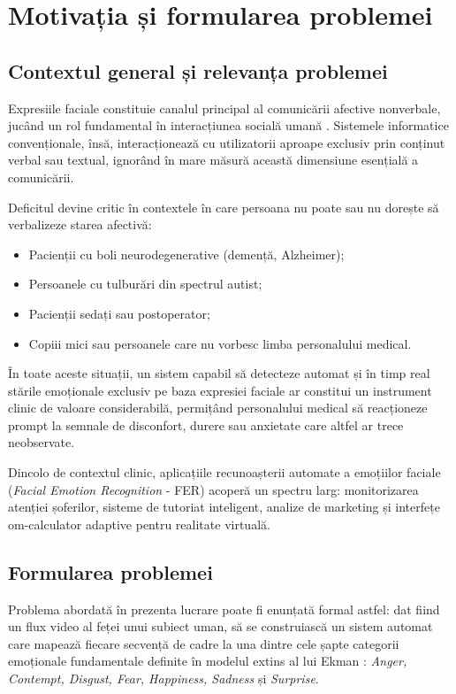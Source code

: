 \chapter{Motivația și formularea problemei}

\section*{Contextul general și relevanța problemei}

Expresiile faciale constituie canalul principal al comunicării afective nonverbale, jucând un rol fundamental în interacțiunea socială umană \cite{sariyanidi2015}. Sistemele informatice convenționale, însă, interacționează cu utilizatorii aproape exclusiv prin conținut verbal sau textual, ignorând în mare măsură această dimensiune esențială a comunicării.

Deficitul devine critic în contextele în care persoana nu poate sau nu dorește să verbalizeze starea afectivă:
\begin{itemize}
	\item Pacienții cu boli neurodegenerative (demență, Alzheimer);
	\item Persoanele cu tulburări din spectrul autist;
	\item Pacienții sedați sau postoperator;
	\item Copiii mici sau persoanele care nu vorbesc limba personalului medical.
\end{itemize}

În toate aceste situații, un sistem capabil să detecteze automat și în timp real stările emoționale exclusiv pe baza expresiei faciale ar constitui un instrument clinic de valoare considerabilă, permițând personalului medical să reacționeze prompt la semnale de disconfort, durere sau anxietate care altfel ar trece neobservate.

Dincolo de contextul clinic, aplicațiile recunoașterii automate a emoțiilor faciale (\textit{Facial Emotion Recognition} - FER) acoperă un spectru larg: monitorizarea atenției șoferilor, sisteme de tutoriat inteligent, analize de marketing și interfețe om-calculator adaptive pentru realitate virtuală.

\section*{Formularea problemei}

Problema abordată în prezenta lucrare poate fi enunțată formal astfel: dat fiind un flux video al feței unui subiect uman, să se construiască un sistem automat care mapează fiecare secvență de cadre la una dintre cele șapte categorii emoționale fundamentale definite în modelul extins al lui Ekman \cite{ekman1986new, ekman1992argument}: \textit{Anger, Contempt, Disgust, Fear, Happiness, Sadness} și \textit{Surprise}.

